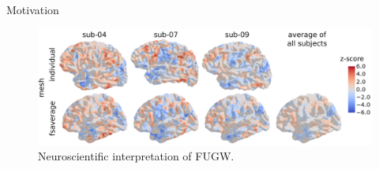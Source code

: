 \documentclass{beamer}
\begin{document}
\begin{frame}{Motivation}
\scriptsize
\begin{figure}
  \centering
  \includegraphics[width=1.\linewidth, keepaspectratio=true]{OT_new/intro_variation.pdf}
  \caption*{\scriptsize{Neuroscientific interpretation of FUGW.}}
\end{figure}

\end{frame}
\end{document}
